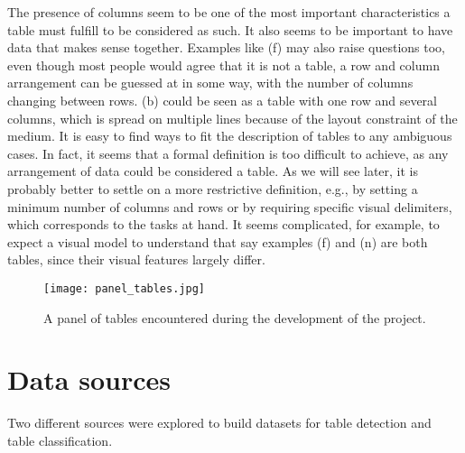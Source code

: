 The presence of columns seem to be one of the most important characteristics a table must fulfill to be considered as such. It also seems to be important to have data that makes sense together. Examples like (f) may also raise questions too, even though most people would agree that it is not a table, a row and column arrangement can be guessed at in some way, with the number of columns changing between rows. (b) could be seen as a table with one row and several columns, which is spread on multiple lines because of the layout constraint of the medium. It is easy to find ways to fit the description of tables to any ambiguous cases. In fact, it seems that a formal definition is too difficult to achieve, as any arrangement of data could be considered a table. As we will see later, it is probably better to settle on a more restrictive definition, e.g., by setting a minimum number of columns and rows or by requiring specific visual delimiters, which corresponds to the tasks at hand. It seems complicated, for example, to expect a visual model to understand that say examples (f) and (n) are both tables, since their visual features largely differ.

\begin{figure}
\centering
\texttt{[image: panel\_tables.jpg]}
\caption{A panel of tables encountered during the development of the project.}
\label{panel_tables}
\end{figure}

\section{Data sources}
\label{data_sources}
Two different sources were explored to build datasets for table detection and table classification. 

